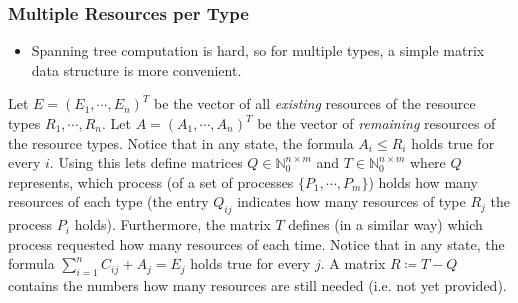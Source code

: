 			\subsubsection{Multiple Resources per Type}
				\label{sec:deadlockdetection}

				\begin{itemize}
					\item Spanning tree computation is hard, so for multiple types, a simple matrix data structure is more convenient.
				\end{itemize}

				Let \( E = (E_1, \cdots, E_n)^T \) be the vector of all \textit{existing} resources of the resource types \( R_1, \cdots, R_n \). Let \( A = (A_1, \cdots, A_n)^T \) be the vector of \textit{remaining} resources of the resource types. Notice that in any state, the formula \( A_i \leq R_i \) holds true for every \(i\). Using this lets define matrices \( Q \in \mathbb{N}_0^{n \times m} \) and \( T \in \mathbb{N}_0^{n \times m} \) where \(Q\) represents, which process (of a set of processes \( \{ P_1, \cdots, P_m \} \)) holds how many resources of each type (the entry \( Q_{ij} \) indicates how many resources of type \( R_j \) the process \( P_i \) holds). Furthermore, the matrix \(T\) defines (in a similar way) which process requested how many resources of each time. Notice that in any state, the formula \( \sum_{i = 1}^{n} C_{ij} + A_j = E_j \) holds true for every \(j\). A matrix \( R \coloneqq T - Q \) contains the numbers how many resources are still needed (i.e. not yet provided).

